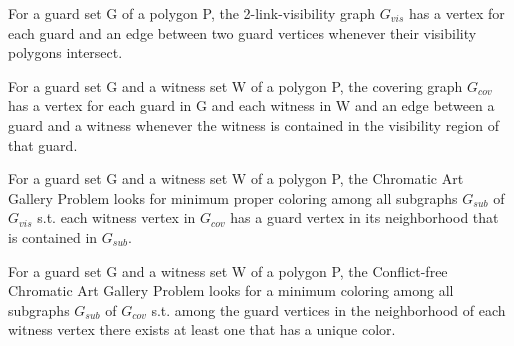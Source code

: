 \begin{definition}
For a guard set G of a polygon P, the 2-link-visibility graph $G_{vis}$ has a vertex for each guard and an edge between two guard vertices whenever their visibility polygons intersect.
\end{definition}

\begin{definition}
For a guard set G and a witness set W of a polygon P, the covering graph $G_{cov}$ has a vertex for each guard in G and each witness in W and an edge between a guard and a witness whenever the witness is contained in the visibility region of that guard.
\end{definition}

\begin{definition}
For a guard set G and a witness set W of a polygon P, the Chromatic Art Gallery Problem looks for minimum proper coloring among all subgraphs $G_{sub}$ of $G_{vis}$ s.t. each witness vertex in $G_{cov}$ has a guard vertex in its neighborhood that is contained in $G_{sub}$.
\end{definition}

\begin{definition}
For a guard set G and a witness set W of a polygon P, the Conflict-free Chromatic Art Gallery Problem looks for a minimum coloring among all subgraphs $G_{sub}$ of $G_{cov}$ s.t. among the guard vertices in the neighborhood of each witness vertex there exists at least one that has a unique color.
\end{definition}
